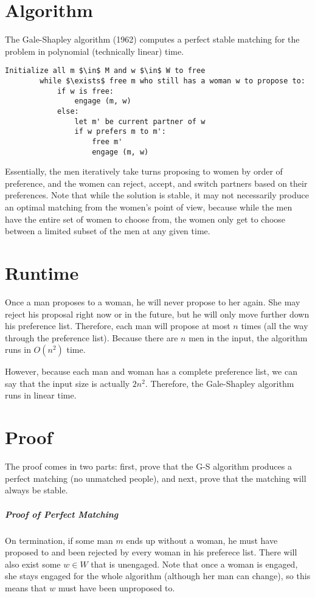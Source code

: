 \documentclass[11pt]{article}
\begin{document}
\section{Algorithm}
	The Gale-Shapley algorithm (1962) computes a perfect stable matching for the problem in polynomial (technically linear) time.
	
	\begin{lstlisting}[autogobble=true,mathescape]
		Initialize all m $\in$ M and w $\in$ W to free
		while $\exists$ free m who still has a woman w to propose to:
			if w is free:
				engage (m, w)
			else:
				let m' be current partner of w
				if w prefers m to m':
					free m'
					engage (m, w)
	\end{lstlisting}
	
	 Essentially, the men iteratively take turns proposing to women by order of preference, and the women can reject, accept, and switch partners based on their preferences. Note that while the solution is stable, it may not necessarily produce an optimal matching from the women's point of view, because while the men have the entire set of women to choose from, the women only get to choose between a limited subset of the men at any given time.
	 
\section{Runtime}
	Once a man proposes to a woman, he will never propose to her again. She may reject his proposal right now or in the future, but he will only move further down his preference list. Therefore, each man will propose at most $n$ times (all the way through the preference list). Because there are $n$ men in the input, the algorithm runs in $O(n^2)$ time.
	
	However, because each man and woman has a complete preference list, we can say that the input size is actually $2n^2$. Therefore, the Gale-Shapley algorithm runs in linear time.
	
\section{Proof}
	The proof comes in two parts: first, prove that the G-S algorithm produces a perfect matching (no unmatched people), and next, prove that the matching will always be stable.
	
	\subparagraph{Proof of Perfect Matching} On termination, if some man $m$ ends up without a woman, he must have proposed to and been rejected by every woman in his preferece list. There will also exist some $w \in W$ that is unengaged. Note that once a woman is engaged, she stays engaged for the whole algorithm (although her man can change), so this means that $w$ must have been unproposed to. 
	
\end{document}
